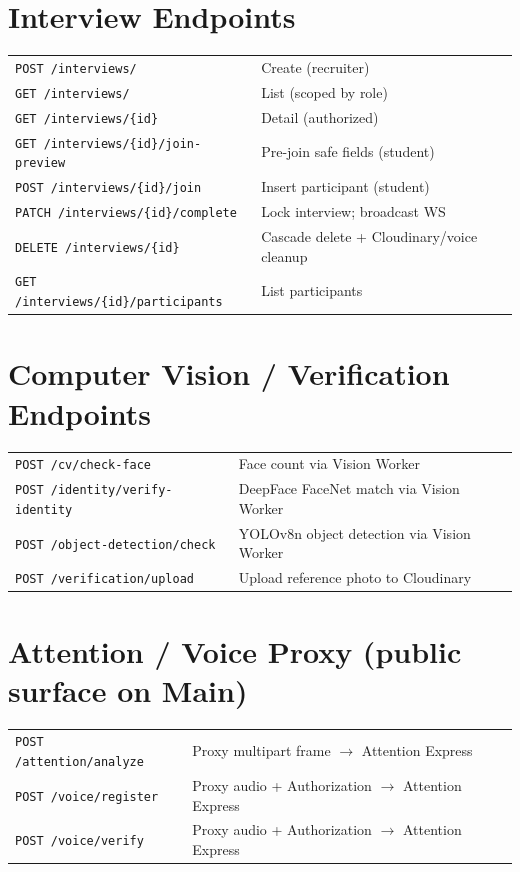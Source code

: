 \documentclass[11pt,a4paper]{report}
\begin{document}
\section{Interview Endpoints}
\begin{tabularx}{\textwidth}{@{}lX@{}}
\toprule
\texttt{POST /interviews/} & Create (recruiter) \\
\texttt{GET /interviews/} & List (scoped by role) \\
\texttt{GET /interviews/\{id\}} & Detail (authorized) \\
\texttt{GET /interviews/\{id\}/join-preview} & Pre-join safe fields (student) \\
\texttt{POST /interviews/\{id\}/join} & Insert participant (student) \\
\texttt{PATCH /interviews/\{id\}/complete} & Lock interview; broadcast WS \\
\texttt{DELETE /interviews/\{id\}} & Cascade delete + Cloudinary/voice cleanup \\
\texttt{GET /interviews/\{id\}/participants} & List participants \\
\bottomrule
\end{tabularx}

\section{Computer Vision / Verification Endpoints}
\begin{tabularx}{\textwidth}{@{}lX@{}}
\toprule
\texttt{POST /cv/check-face} & Face count via Vision Worker \\
\texttt{POST /identity/verify-identity} & DeepFace FaceNet match via Vision Worker \\
\texttt{POST /object-detection/check} & YOLOv8n object detection via Vision Worker \\
\texttt{POST /verification/upload} & Upload reference photo to Cloudinary \\
\bottomrule
\end{tabularx}

\section{Attention / Voice Proxy (public surface on Main)}
\begin{tabularx}{\textwidth}{@{}lX@{}}
\toprule
\texttt{POST /attention/analyze} & Proxy multipart frame $\rightarrow$ Attention Express \\
\texttt{POST /voice/register} & Proxy audio + Authorization $\rightarrow$ Attention Express \\
\texttt{POST /voice/verify} & Proxy audio + Authorization $\rightarrow$ Attention Express \\
\bottomrule
\end{tabularx}
\end{document}
